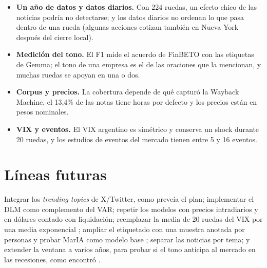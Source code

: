 \begin{itemize}
  \item \textbf{Un año de datos y datos diarios.} Con 224 ruedas, un efecto chico de las
        noticias podría no detectarse; y los datos diarios no ordenan lo que pasa dentro de una
        rueda (algunas acciones cotizan también en Nueva York después del cierre local).
  \item \textbf{Medición del tono.} El F1 mide el acuerdo de FinBETO con las etiquetas de Gemma;
        el tono de una empresa es el de las oraciones que la mencionan, y muchas ruedas se apoyan
        en una o dos.
  \item \textbf{Corpus y precios.} La cobertura depende de qué capturó la Wayback Machine, el
        13,4\% de las notas tiene horas por defecto y los precios están en pesos nominales.
  \item \textbf{VIX y eventos.} El VIX argentino es simétrico y conserva un shock durante 20
        ruedas, y los estudios de eventos del mercado tienen entre 5 y 16 eventos.
\end{itemize}

\section{Líneas futuras}

Integrar los \textit{trending topics} de X/Twitter, como preveía el plan; implementar el DLM como
complemento del VAR; repetir los modelos con precios intradiarios y en dólares contado con
liquidación; reemplazar la media de 20 ruedas del VIX por una media exponencial
\citep{riskmetrics1996}; ampliar el etiquetado con una muestra anotada por personas y probar MarIA
como modelo base \citep{gutierrez2022maria}; separar las noticias por tema; y extender la ventana
a varios años, para probar si el tono anticipa al mercado en las recesiones, como encontró
\citet{garcia2013}.
